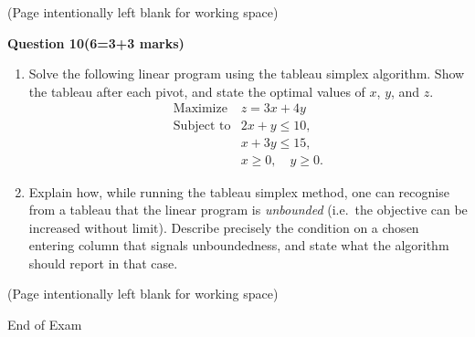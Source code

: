 \documentclass[12pt,letterpaper]{article}
\newcommand{\marksbox}[1]{%
  \vfill
  \begin{flushright}
    \fbox{\parbox[c][1.1cm][c]{1.3cm}{\centering #1}}
  \end{flushright}
}
\newcommand{\questiontitle}[2]{%
  \textbf{Question #1}\hfill\textbf{(#2 marks)}
}
\newcommand{\workingpage}{%
  \newpage
  \begin{center}
    (Page intentionally left blank for working space)
  \end{center}
}
\begin{document}
\marksbox{6}

\workingpage
\newpage

\questiontitle{10}{6=3+3}

\begin{enumerate}
  \item[(i)] Solve the following linear program using the tableau simplex
  algorithm. Show the tableau after each pivot, and state the optimal values of
  $x$, $y$, and $z$.
  \[
  \begin{array}{rl}
  \text{Maximize} & z = 3x + 4y \\
  \text{Subject to} & 2x + y \leq 10, \\
                    & x + 3y \leq 15, \\
                    & x \geq 0,\quad y \geq 0.
  \end{array}
  \]

  \item[(ii)] Explain how, while running the tableau simplex method, one can
  recognise from a tableau that the linear program is \emph{unbounded} (i.e.\
  the objective can be increased without limit). Describe precisely the
  condition on a chosen entering column that signals unboundedness, and state
  what the algorithm should report in that case.
\end{enumerate}

\marksbox{6}

\workingpage

\vfill
\begin{center}
  End of Exam
\end{center}
\end{document}
